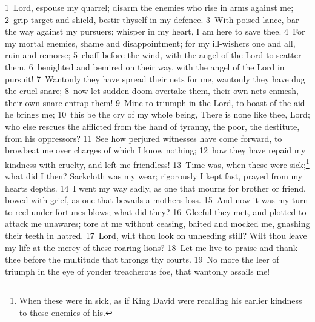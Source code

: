 \documentclass[10pt]{book} %
\begin{document}
\textcolor{benred8}{1}~Lord, espouse my quarrel; disarm the enemies who rise in arms against me; \textcolor{benred8}{2}~grip target and shield, bestir thyself in my defence. \textcolor{benred8}{3}~With poised lance, bar the way against my pursuers; whisper in my heart, I am here to save thee. \textcolor{benred8}{4}~For my mortal enemies, shame and disappointment; for my ill-wishers one and all, ruin and remorse; \textcolor{benred8}{5}~chaff before the wind, with the angel of the Lord to scatter them, \textcolor{benred8}{6}~benighted and bemired on their way, with the angel of the Lord in pursuit! \textcolor{benred8}{7}~Wantonly they have spread their nets for me, wantonly they have dug the cruel snare; \textcolor{benred8}{8}~now let sudden doom overtake them, their own nets enmesh, their own snare entrap them! \textcolor{benred8}{9}~Mine to triumph in the Lord, to boast of the aid he brings me; \textcolor{benred8}{10}~this be the cry of my whole being, There is none like thee, Lord; who else rescues the afflicted from the hand of tyranny, the poor, the destitute, from his oppressors? \textcolor{benred8}{11}~See how perjured witnesses have come forward, to browbeat me over charges of which I know nothing; \textcolor{benred8}{12}~how they have repaid my kindness with cruelty, and left me friendless! \textcolor{benred8}{13}~Time was, when these were sick;\footnote[1]{\textasciigrave When these were in sick\textquotesingle , as if King David were recalling his earlier kindness to these enemies of his.} what did I then? Sackcloth was my wear; rigorously I kept fast, prayed from my heart\textquotesingle s depths. \textcolor{benred8}{14}~I went my way sadly, as one that mourns for brother or friend, bowed with grief, as one that bewails a mother\textquotesingle s loss. \textcolor{benred8}{15}~And now it was my turn to reel under fortune\textquotesingle s blows; what did they? \textcolor{benred8}{16}~Gleeful they met, and plotted to attack me unawares; tore at me without ceasing, baited and mocked me, gnashing their teeth in hatred. \textcolor{benred8}{17}~Lord, wilt thou look on unheeding still? Wilt thou leave my life at the mercy of these roaring lions? \textcolor{benred8}{18}~Let me live to praise and thank thee before the multitude that throngs thy courts. \textcolor{benred8}{19}~No more the leer of triumph in the eye of yonder treacherous foe, that wantonly assails me!
\end{document}
